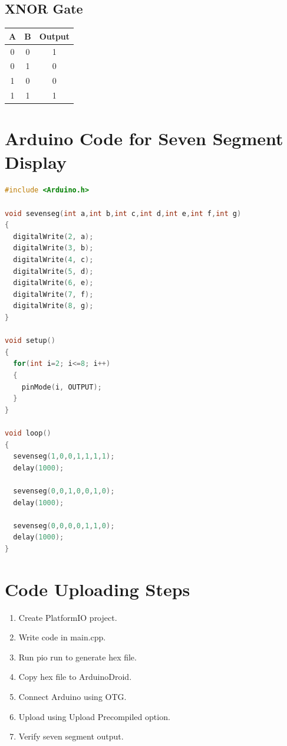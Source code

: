 \documentclass[12pt]{article}
\begin{document}
\subsection*{XNOR Gate}
\begin{center}
\begin{tabular}{|c|c|c|}
\hline
A & B & Output \\
\hline
0 & 0 & 1 \\
0 & 1 & 0 \\
1 & 0 & 0 \\
1 & 1 & 1 \\
\hline
\end{tabular}
\end{center}

\vspace{1cm}

\section*{Arduino Code for Seven Segment Display}

\begin{lstlisting}[language=C++]
#include <Arduino.h>

void sevenseg(int a,int b,int c,int d,int e,int f,int g)
{
  digitalWrite(2, a);
  digitalWrite(3, b);
  digitalWrite(4, c);
  digitalWrite(5, d);
  digitalWrite(6, e);
  digitalWrite(7, f);
  digitalWrite(8, g);
}

void setup()
{
  for(int i=2; i<=8; i++)
  {
    pinMode(i, OUTPUT);
  }
}

void loop()
{
  sevenseg(1,0,0,1,1,1,1);
  delay(1000);

  sevenseg(0,0,1,0,0,1,0);
  delay(1000);

  sevenseg(0,0,0,0,1,1,0);
  delay(1000);
}
\end{lstlisting}

\vspace{1cm}

\section*{Code Uploading Steps}

\begin{enumerate}
\item Create PlatformIO project.
\item Write code in main.cpp.
\item Run pio run to generate hex file.
\item Copy hex file to ArduinoDroid.
\item Connect Arduino using OTG.
\item Upload using Upload Precompiled option.
\item Verify seven segment output.
\end{enumerate}
\end{document}
